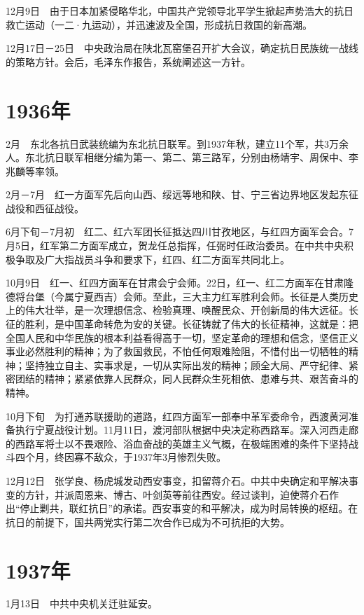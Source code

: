 \documentclass[10pt,a4paper,twocolumn]{book}
\begin{document}
12月9日　由于日本加紧侵略华北，中国共产党领导北平学生掀起声势浩大的抗日救亡运动（一二·九运动），并迅速波及全国，形成抗日救国的新高潮。

12月17日－25日　中央政治局在陕北瓦窑堡召开扩大会议，确定抗日民族统一战线的策略方针。会后，毛泽东作报告，系统阐述这一方针。

\section{1936年}

2月　东北各抗日武装统编为东北抗日联军。到1937年秋，建立11个军，共3万余人。东北抗日联军相继分编为第一、第二、第三路军，分别由杨靖宇、周保中、李兆麟等率领。

2月－7月　红一方面军先后向山西、绥远等地和陕、甘、宁三省边界地区发起东征战役和西征战役。

6月下旬－7月初　红二、红六军团长征抵达四川甘孜地区，与红四方面军会合。7月5日，红军第二方面军成立，贺龙任总指挥，任弼时任政治委员。在中共中央积极争取及广大指战员斗争和要求下，红四、红二方面军共同北上。

10月9日　红一、红四方面军在甘肃会宁会师。22日，红一、红二方面军在甘肃隆德将台堡（今属宁夏西吉）会师。至此，三大主力红军胜利会师。长征是人类历史上的伟大壮举，是一次理想信念、检验真理、唤醒民众、开创新局的伟大远征。长征的胜利，是中国革命转危为安的关键。长征铸就了伟大的长征精神，这就是：把全国人民和中华民族的根本利益看得高于一切，坚定革命的理想和信念，坚信正义事业必然胜利的精神；为了救国救民，不怕任何艰难险阻，不惜付出一切牺牲的精神；坚持独立自主、实事求是，一切从实际出发的精神；顾全大局、严守纪律、紧密团结的精神；紧紧依靠人民群众，同人民群众生死相依、患难与共、艰苦奋斗的精神。

10月下旬　为打通苏联援助的道路，红四方面军一部奉中革军委命令，西渡黄河准备执行宁夏战役计划。11月11日，渡河部队根据中央决定称西路军。深入河西走廊的西路军将士以不畏艰险、浴血奋战的英雄主义气概，在极端困难的条件下坚持战斗四个月，终因寡不敌众，于1937年3月惨烈失败。

12月12日　张学良、杨虎城发动西安事变，扣留蒋介石。中共中央确定和平解决事变的方针，并派周恩来、博古、叶剑英等前往西安。经过谈判，迫使蒋介石作出“停止剿共，联红抗日”的承诺。西安事变的和平解决，成为时局转换的枢纽。在抗日的前提下，国共两党实行第二次合作已成为不可抗拒的大势。

\section{1937年}

1月13日　中共中央机关迁驻延安。
\end{document}
